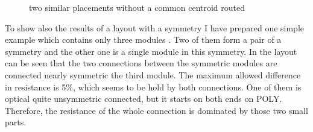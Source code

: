 \begin{figure}
	\caption{two similar placements without a common centroid routed}
	\label{fig:miller_amplifier_smaller_routed_line_expansion_router}
\end{figure}

To show also the results of a layout with a symmetry I have prepared one simple example which contains only three modules . Two of them form a pair of a symmetry and the other one is a single module in this symmetry. In the layout can be seen that the two connections between the symmetric modules are connected nearly symmetric the third module. The maximum allowed difference in resistance is 5\%, which seems to be hold by both connections. One of them is optical quite unsymmetric connected, but it starts on both ends on POLY. Therefore, the resistance of the whole connection is dominated by those two small parts.

